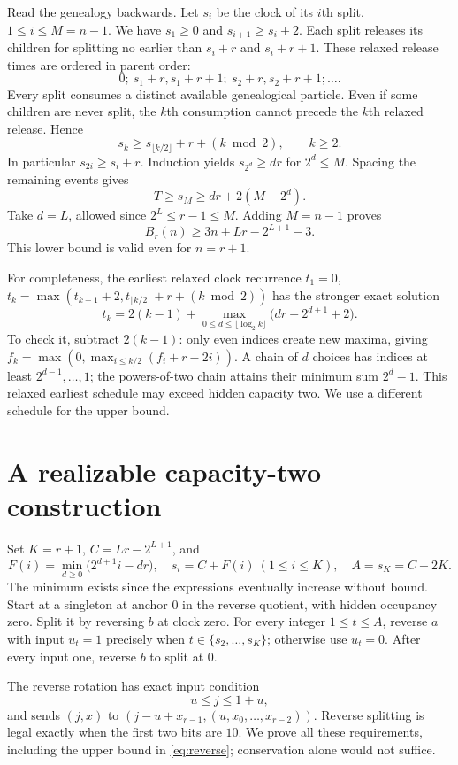 \documentclass[11pt]{article}
\begin{document}
Read the genealogy backwards. Let $s_i$ be the clock of its $i$th split,
$1\le i\le M=n-1$. We have $s_1\ge0$ and $s_{i+1}\ge s_i+2$.
Each split releases its children for splitting no earlier than $s_i+r$
and $s_i+r+1$. These relaxed release times are ordered in parent order:
\[
0;\ s_1+r,s_1+r+1;\ s_2+r,s_2+r+1;\ldots .
\]
Every split consumes a distinct available genealogical particle. Even if
some children are never split, the $k$th consumption cannot precede the
$k$th relaxed release. Hence
\begin{equation}\label{eq:release}
s_k\ge s_{\lfloor k/2\rfloor}+r+(k\bmod2),\qquad k\ge2.
\end{equation}
In particular $s_{2i}\ge s_i+r$. Induction yields $s_{2^d}\ge dr$ for
$2^d\le M$. Spacing the remaining events gives
\[
T\ge s_M\ge dr+2(M-2^d).
\]
Take $d=L$, allowed since $2^L\le r-1\le M$. Adding $M=n-1$ proves
\begin{equation}\label{eq:lower}
B_r(n)\ge3n+Lr-2^{L+1}-3.
\end{equation}
This lower bound is valid even for $n=r+1$.

For completeness, the earliest relaxed clock recurrence
$t_1=0$, $t_k=\max(t_{k-1}+2,t_{\lfloor k/2\rfloor}+r+(k\bmod2))$
has the stronger exact solution
\[
t_k=2(k-1)+\max_{0\le d\le\lfloor\log_2k\rfloor}
\bigl(dr-2^{d+1}+2\bigr).
\]
To check it, subtract $2(k-1)$: only even indices create new maxima, giving
$f_k=\max(0,\max_{i\le k/2}(f_i+r-2i))$. A chain of $d$ choices has
indices at least $2^{d-1},\ldots,1$; the powers-of-two chain attains their
minimum sum $2^d-1$. This relaxed earliest schedule may exceed hidden
capacity two. We use a different schedule for the upper bound.

\section{A realizable capacity-two construction}
Set $K=r+1$, $C=Lr-2^{L+1}$, and
\[
F(i)=\min_{d\ge0}\bigl(2^{d+1}i-dr\bigr),\quad
s_i=C+F(i)\ (1\le i\le K),\quad A=s_K=C+2K.
\]
The minimum exists since the expressions eventually increase without
bound. Start at a singleton at anchor $0$ in the reverse quotient, with
hidden occupancy zero. Split it by reversing $b$ at clock zero. For every
integer $1\le t\le A$, reverse $a$ with input $u_t=1$ precisely when
$t\in\{s_2,\ldots,s_K\}$; otherwise use $u_t=0$. After every input one,
reverse $b$ to split at $0$.

The reverse rotation has exact input condition
\begin{equation}\label{eq:reverse}
u\le j\le1+u,
\end{equation}
and sends $(j,x)$ to $(j-u+x_{r-1},(u,x_0,\ldots,x_{r-2}))$.
Reverse splitting is legal exactly when the first two bits are $10$.
We prove all these requirements, including the upper bound in
\eqref{eq:reverse}; conservation alone would not suffice.
\end{document}
